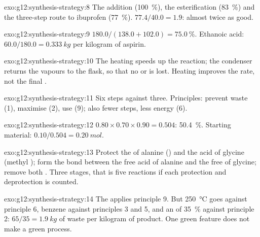 \begin{solution}{exo:g12:synthesis-strategy:8}
The addition (\qty{100}{\percent}), the esterification
(\qty{83}{\percent}) and the three-step route to ibuprofen
(\qty{77}{\percent}). $77.4/40.0 = 1.9$: almost twice as good.
\end{solution}

\begin{solution}{exo:g12:synthesis-strategy:9}
$180.0/(138.0 + 102.0) = \qty{75.0}{\percent}$. Ethanoic acid:
$60.0/180.0 = \qty{0.333}{kg}$ per kilogram of aspirin.
\end{solution}

\begin{solution}{exo:g12:synthesis-strategy:10}
The heating speeds up the reaction; the condenser returns the vapours
to the flask, so that no  or  is lost. Heating improves
the rate, not the final .
\end{solution}

\begin{solution}{exo:g12:synthesis-strategy:11}
Six steps against three. Principles: prevent waste (1), maximise  (2), use  (9); also fewer steps, less energy (6).
\end{solution}

\begin{solution}{exo:g12:synthesis-strategy:12}
$0.80 \times 0.70 \times 0.90 = 0.504$: \qty{50.4}{\percent}. Starting
material: $0.10/0.504 = \qty{0.20}{mol}$.
\end{solution}

\begin{solution}{exo:g12:synthesis-strategy:13}
Protect the  of alanine () and the acid of glycine (methyl );
form the  bond between the free acid of alanine and the free 
of glycine; remove both . Three stages, that is five
reactions if each protection and deprotection is counted.
\end{solution}

\begin{solution}{exo:g12:synthesis-strategy:14}
The  applies principle 9. But \qty{250}{\celsius} goes against
principle 6, benzene against principles 3 and 5, and an  of
\qty{35}{\percent} against principle 2: $65/35 = \qty{1.9}{kg}$ of waste
per kilogram of product. One green feature does not make a green
process.
\end{solution}

